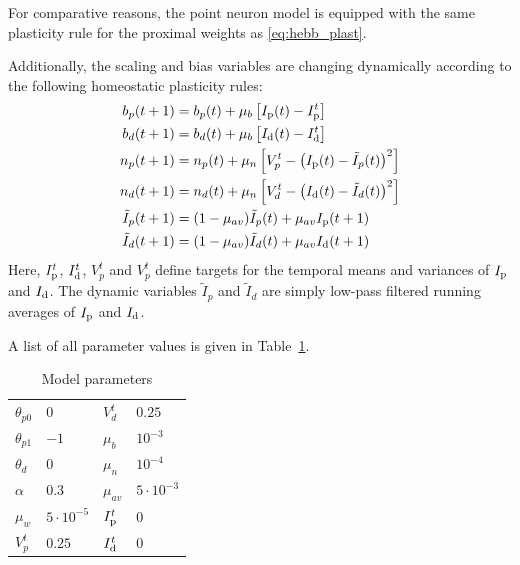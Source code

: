 \documentclass[10pt,a4paper,twocolumn]{article}
\begin{document}
		For comparative reasons, the point neuron model is equipped with the
		same plasticity rule for the proximal weights as \eqref{eq:hebb_plast}. 
		
		Additionally, the scaling and bias variables are changing dynamically
		according to the following homeostatic plasticity rules:
		\begin{align}
			b_p(t+1) &= b_p(t) + \mu_b \left[I_{\rm p}(t) - I_{\rm p}^t\right] \\
			b_d(t+1) &= b_d(t) + \mu_b \left[I_{\rm d}(t) - I_{\rm d}^t\right] \\
			n_p(t+1) &= n_p(t) + \mu_n \left[V_p^t - \left( I_{\rm p}(t) - \tilde{I}_p(t)\right)^2\right] \\
			n_d(t+1) &= n_d(t) + \mu_n \left[V_d^t - \left( I_{\rm d}(t) - \tilde{I}_d(t)\right)^2\right] \\
			\tilde{I}_p(t+1) &= (1-\mu_{av})\tilde{I}_p(t) + \mu_{av} I_{\rm p}(t+1) \\
			\tilde{I}_d(t+1) &= (1-\mu_{av})\tilde{I}_d(t) + \mu_{av} I_{\rm d}(t+1)
		\end{align}
		Here, $I_{\rm p}^t$, $I_{\rm d}^t$, $V_p^t$ and $V_p^t$ define targets for the 
		temporal means and variances of $I_{\rm p}$ and $I_{\rm d}$. The dynamic variables 
		$\tilde{I}_p$ and $\tilde{I}_d$ are simply low-pass filtered running 
		averages of $I_{\rm p}$ and $I_{\rm d}$.
		
		A list of all parameter values is given in Table~\ref{tab:parameters}.
		
		\begin{table}
			\begin{tabular}{ l | l || l | l }
				$\theta_{p0}$ & $0$ & $V_d^t$ & $0.25$ \\
				$\theta_{p1}$ & $-1$ & $\mu_b$ & $10^{-3}$ \\ 
				$\theta_{d}$ & $0$ & $\mu_n$ & $10^{-4}$ \\  
				$\alpha$ & $0.3$ & $\mu_{av}$ & $5 \cdot 10^{-3}$ \\   
				$\mu_w$ & $5 \cdot 10^{-5}$ & $I_{\rm p}^t$ & $0$ \\
				$V_p^t$ & $0.25$ & $I_{\rm d}^t$ & $0$  
			\end{tabular}
		\caption{Model parameters}
		\label{tab:parameters}
		\end{table}
		
\end{document}
